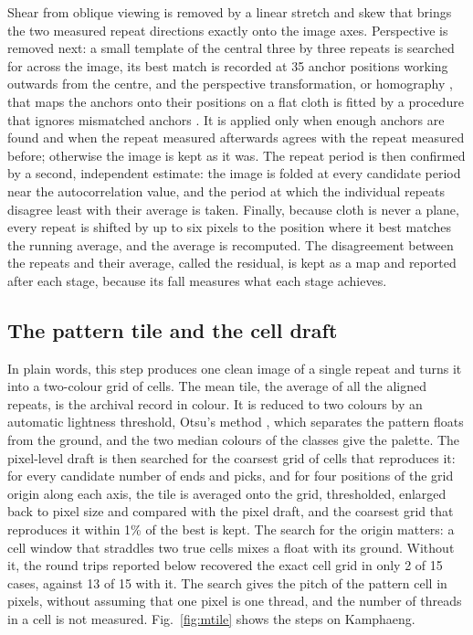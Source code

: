 \documentclass[12pt]{article}
\begin{document}
Shear from oblique viewing is removed by a linear stretch and skew that brings the two measured repeat directions exactly onto the image axes. Perspective is removed next: a small template of the central three by three repeats is searched for across the image, its best match is recorded at 35 anchor positions working outwards from the centre, and the perspective transformation, or homography \citep{hartley2003}, that maps the anchors onto their positions on a flat cloth is fitted by a procedure that ignores mismatched anchors \citep{fischler1981}. It is applied only when enough anchors are found and when the repeat measured afterwards agrees with the repeat measured before; otherwise the image is kept as it was. The repeat period is then confirmed by a second, independent estimate: the image is folded at every candidate period near the autocorrelation value, and the period at which the individual repeats disagree least with their average is taken. Finally, because cloth is never a plane, every repeat is shifted by up to six pixels to the position where it best matches the running average, and the average is recomputed. The disagreement between the repeats and their average, called the residual, is kept as a map and reported after each stage, because its fall measures what each stage achieves.

\subsection{The pattern tile and the cell draft}

In plain words, this step produces one clean image of a single repeat and turns it into a two-colour grid of cells. The mean tile, the average of all the aligned repeats, is the archival record in colour. It is reduced to two colours by an automatic lightness threshold, Otsu's method \citep{otsu1979}, which separates the pattern floats from the ground, and the two median colours of the classes give the palette. The pixel-level draft is then searched for the coarsest grid of cells that reproduces it: for every candidate number of ends and picks, and for four positions of the grid origin along each axis, the tile is averaged onto the grid, thresholded, enlarged back to pixel size and compared with the pixel draft, and the coarsest grid that reproduces it within 1\% of the best is kept. The search for the origin matters: a cell window that straddles two true cells mixes a float with its ground. Without it, the round trips reported below recovered the exact cell grid in only 2 of 15 cases, against 13 of 15 with it. The search gives the pitch of the pattern cell in pixels, without assuming that one pixel is one thread, and the number of threads in a cell is not measured. Fig.~\ref{fig:mtile} shows the steps on Kamphaeng.
\end{document}
